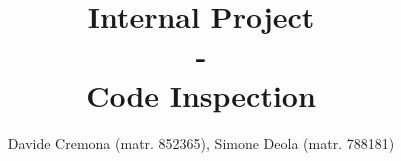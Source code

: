 \documentclass{report}
\begin{document}
\title{\textbf{Internal Project} \\-\\ \textbf{Code Inspection}}
\author{Davide Cremona (matr. 852365), Simone Deola (matr. 788181)}
 
\maketitle

\tableofcontents












 
\end{document}
